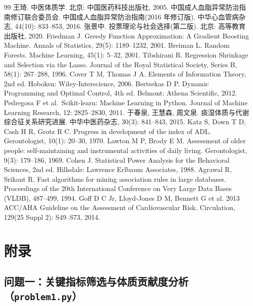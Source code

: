 \documentclass{MathorCupmodeling}
\begin{document}
\begin{thebibliography}{99}
 王琦. 中医体质学. 北京: 中国医药科技出版社, 2005.
 中国成人血脂异常防治指南修订联合委员会. 中国成人血脂异常防治指南(2016 年修订版). 中华心血管病杂志, 44(10): 833--853, 2016.
 张景中. 投票理论与社会选择(第二版). 北京: 高等教育出版社, 2020.
 Friedman J. Greedy Function Approximation: A Gradient Boosting Machine. Annals of Statistics, 29(5): 1189--1232, 2001.
 Breiman L. Random Forests. Machine Learning, 45(1): 5--32, 2001.
 Tibshirani R. Regression Shrinkage and Selection via the Lasso. Journal of the Royal Statistical Society, Series B, 58(1): 267--288, 1996.
 Cover T M, Thomas J A. Elements of Information Theory, 2nd ed. Hoboken: Wiley-Interscience, 2006.
 Bertsekas D P. Dynamic Programming and Optimal Control, 4th ed. Belmont: Athena Scientific, 2012.
 Pedregosa F et al.~Scikit-learn: Machine Learning in Python. Journal of Machine Learning Research, 12: 2825--2830, 2011.
 于春泉, 王慧森, 周文泉. 痰湿体质与代谢综合征关系研究进展. 中华中医药杂志, 30(3): 841--843, 2015.
 Katz S, Down T D, Cash H R, Grotz R C. Progress in development of the index of ADL. Gerontologist, 10(1): 20--30, 1970.
 Lawton M P, Brody E M. Assessment of older people: self-maintaining and instrumental activities of daily living. Gerontologist, 9(3): 179--186, 1969.
 Cohen J. Statistical Power Analysis for the Behavioral Sciences, 2nd ed. Hillsdale: Lawrence Erlbaum Associates, 1988.
 Agrawal R, Srikant R. Fast algorithms for mining association rules in large databases. Proceedings of the 20th International Conference on Very Large Data Bases (VLDB), 487--499, 1994.
 Goff D C Jr, Lloyd-Jones D M, Bennett G et al. 2013 ACC/AHA Guideline on the Assessment of Cardiovascular Risk. Circulation, 129(25 Suppl 2): S49--S73, 2014.
\end{thebibliography}

\appendix
\section{附录}

\subsection{问题一：关键指标筛选与体质贡献度分析（\texttt{problem1.py}）}
\end{document}
